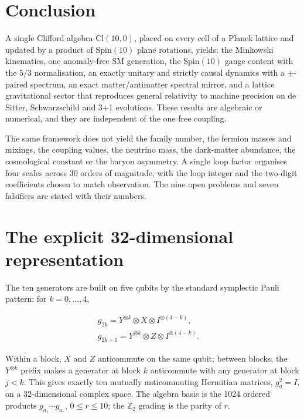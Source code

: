 \documentclass[aps,prd,twocolumn,amsmath,amssymb,superscriptaddress,nofootinbib,floatfix]{revtex4-2}
\begin{document}
\section{Conclusion}\label{conclusion}

A single Clifford algebra \(\mathrm{Cl}(10,0)\), placed on every cell of
a Planck lattice and updated by a product of \(\mathrm{Spin}(10)\) plane
rotations, yields: the Minkowski kinematics, one anomaly-free SM
generation, the \(\mathrm{Spin}(10)\) gauge content with the \(5/3\)
normalisation, an exactly unitary and strictly causal dynamics with a
\(\pm\)-paired spectrum, an exact matter/antimatter spectral mirror, and
a lattice gravitational sector that reproduces general relativity to
machine precision on de Sitter, Schwarzschild and 3+1 evolutions. These
results are algebraic or numerical, and they are independent of the one
free coupling.

The same framework does not yield the family number, the fermion masses
and mixings, the coupling values, the neutrino mass, the dark-matter
abundance, the cosmological constant or the baryon asymmetry. A single
loop factor organises four scales across 30 orders of magnitude, with
the loop integer and the two-digit coefficients chosen to match
observation. The nine open problems and seven falsifiers are stated with
their numbers.

\section{The explicit 32-dimensional
representation}\label{the-explicit-32-dimensional-representation}

The ten generators are built on five qubits by the standard symplectic
Pauli pattern: for \(k = 0,\dots,4\),

\begin{multline}
    g_{2k} = Y^{\otimes k}\otimes X\otimes I^{\otimes(4-k)},\qquad \\
    g_{2k+1} = Y^{\otimes k}\otimes Z\otimes I^{\otimes(4-k)}.
\end{multline}

Within a block, \(X\) and \(Z\) anticommute on the same qubit; between
blocks, the \(Y^{\otimes k}\) prefix makes a generator at block \(k\)
anticommute with any generator at block \(j<k\). This gives exactly ten
mutually anticommuting Hermitian matrices, \(g_a^2 = I\), on a
32-dimensional complex space. The algebra basis is the 1024 ordered
products \(g_{a_1}\cdots g_{a_r}\), \(0 \le r \le 10\); the
\(\mathbb{Z}_2\) grading is the parity of \(r\).
\end{document}
